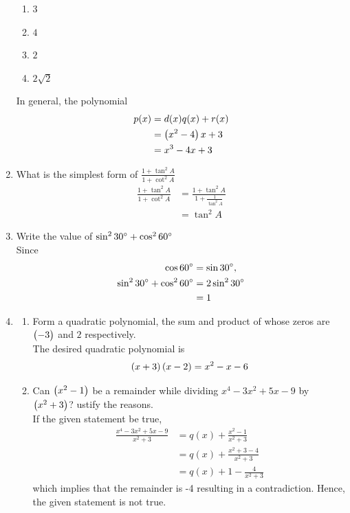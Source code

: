 \documentclass[journal,12pt,twocolumn]{IEEEtran}
\begin{document}
\begin{enumerate}
\begin{enumerate}
    \item $3$
    \item $4$
    \item $2$
    \item $2\sqrt{2}$
\end{enumerate}
\solution In general, the polynomial
\begin{align}
	p(x) &= d(x)q(x) + r(x)
	\\
	&= \left(x^2-4\right)x +3
	\\
	&= x^3 - 4x + 3
\end{align}
\item What is the simplest form of $\frac{1 + \tan^2 A}{1 + \cot^2 A}$\\
	\solution
		\begin{align}
			\frac{1 + \tan^2 A}{1 + \cot^2 A} 
			&=\frac{1 + \tan^2 A}{1 + \frac{1}{\tan^2 A}} 
			\\
			&=\tan^2 A
		\end{align}
\item Write the value of $\sin^2 30\degree + \cos^2 60\degree$\\
	\solution Since 
  \begin{align}
	  \cos 60\degree &= \sin 30\degree, 
	  \\
	  \sin^2 30\degree + \cos^2 60\degree &= 
2\sin^2 30\degree 
\\
	  &=1
  \end{align}
\item \begin{enumerate}
    \item Form a quadratic polynomial, the sum and product of whose zeros are $\begin{pmatrix}-3\end{pmatrix}$ and $2$ respectively.\\
	    \solution  The desired quadratic polynomial is 
  \begin{align}
	  \left(x+3\right)\left(x-2\right) = x^2-x-6
  \end{align}
    \item Can $\begin{pmatrix}x^2 - 1\end{pmatrix}$ be a remainder while dividing $x^4 - 3x^2 + 5x - 9$ by $\begin{pmatrix}x^2 + 3\end{pmatrix}$? ustify the reasons.\\
	    \solution  If the given statement be true, 
  \begin{align}
	  \frac{x^4 - 3x^2 + 5x - 9}{x^2 + 3} &= q(x) +\frac{ x^2 - 1}{x^2+3}
	  \\
	  &= q(x) +\frac{ x^2 +3 - 4}{x^2+3}
	  \\
	  &=q(x) + 1 - \frac{4}{x^2+3} 
  \end{align}
  which implies that the remainder is -4 resulting in a contradiction.  Hence, the given statement is not true.

\end{enumerate}
\end{enumerate}
\end{document}
